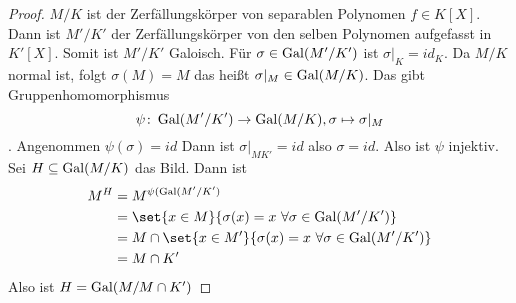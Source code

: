 \begin{proof}
    \(M/K\) ist der Zerfällungskörper von separablen Polynomen \(f\in K[X]\). Dann ist \(M'/K'\) der Zerfällungskörper von den selben Polynomen aufgefasst in \(K'[X]\). Somit ist \(M'/K'\) Galoisch.
    Für \(\sigma\in\operatorname{Gal}(M'/K')\) ist \(\sigma|_K=id_K\).
    Da \(M/K\) normal ist, folgt \(\sigma(M)=M\) das heißt \(\sigma|_M\in \operatorname{Gal}(M/K)\). Das gibt Gruppenhomomorphismus
    \[\psi\colon \operatorname{Gal}(M'/K')\to\operatorname{Gal}(M/K),\sigma\mapsto \sigma|_M\].
    Angenommen \(\psi(\sigma)=id\) Dann ist \(\sigma|_{MK'}=id\) also \(\sigma=id\). Also ist \(\psi\) injektiv. Sei \(H\subseteq \operatorname{Gal}(M/K)\) das Bild.
    Dann ist 
    \begin{align*}
        M^H&=M^{\psi(\Gal(M'/K')}\\
        &= \set{ x\in M}{ \sigma(x)=x\ \forall\sigma\in\Gal(M'/K')}\\
        &= M\cap\set{ x\in M'}{ \sigma(x)=x\ \forall\sigma\in\Gal(M'/K')}\\
        &= M\cap K'
    \end{align*}
    Also ist \(H=\operatorname{Gal}(M/M\cap K')\)
\end{proof}
